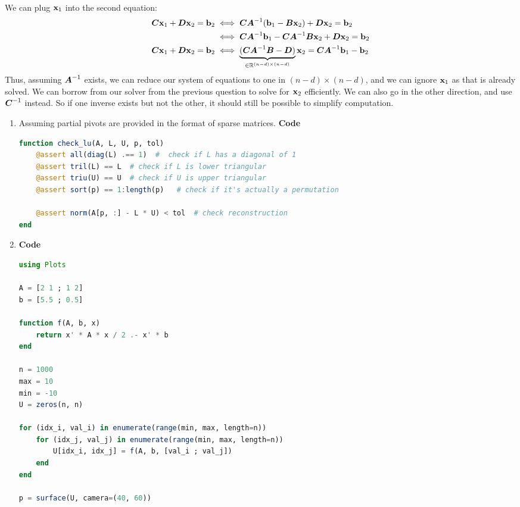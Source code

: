 \documentclass[]{exam}
\begin{document}
\begin{questions}
\begin{enumerate}[label=\arabic*.]
\begin{gather*}
		\end{gather*}
		We can plug $\boldsymbol{\mathrm{x}}_1$ into the second equation:
		\begin{align*}
			\boldsymbol{C} \boldsymbol{\mathrm{x}}_1 + \boldsymbol{D} \boldsymbol{\mathrm{x}}_2 = \boldsymbol{\mathrm{b}}_2 &\iff \boldsymbol{C} \boldsymbol{A}^{-1} (\boldsymbol{\mathrm{b}}_1 - \boldsymbol{B} \boldsymbol{\mathrm{x}}_2) + \boldsymbol{D} \boldsymbol{\mathrm{x}}_2 = \boldsymbol{\mathrm{b}}_2 \\
			&\iff \boldsymbol{C} \boldsymbol{A}^{-1} \boldsymbol{\mathrm{b}}_1 - \boldsymbol{C} \boldsymbol{A}^{-1} \boldsymbol{B} \boldsymbol{\mathrm{x}}_2 + \boldsymbol{D} \boldsymbol{\mathrm{x}}_2 = \boldsymbol{\mathrm{b}}_2 \\
			\boldsymbol{C} \boldsymbol{\mathrm{x}}_1 + \boldsymbol{D} \boldsymbol{\mathrm{x}}_2 = \boldsymbol{\mathrm{b}}_2 &\iff \underbrace{(\boldsymbol{C} \boldsymbol{A}^{-1} \boldsymbol{B} - \boldsymbol{D})}_{\in \mathbb{R}^{(n - d) \times (n - d)}} \boldsymbol{\mathrm{x}}_2 = \boldsymbol{C} \boldsymbol{A}^{-1} \boldsymbol{\mathrm{b}}_1 - \boldsymbol{\mathrm{b}}_2
		\end{align*}
		Thus, assuming $\boldsymbol{A}^{-1}$ exists, we can reduce our system of equations to one in $(n - d) \times (n - d)$, and we can ignore $\boldsymbol{\mathrm{x}}_1$ as that is already solved. We can borrow from our solver from the previous question to solve for $\boldsymbol{\mathrm{x}}_2$ efficiently. We can also go in the other direction, and use $\boldsymbol{C}^{-1}$ instead. So if one inverse exists but not the other, it should still be possible to simplify computation.
\end{enumerate}

\newpage
\question
\hfill

\begin{enumerate}[label=\arabic*.]
	\item Assuming partial pivots are provided in the format of sparse matrices. \textbf{Code}
		\begin{lstlisting}[language=julia]
function check_lu(A, L, U, p, tol)
	@assert all(diag(L) .== 1)  #  check if L has a diagonal of 1
	@assert tril(L) == L  # check if L is lower triangular
	@assert triu(U) == U  # check if U is upper triangular
	@assert sort(p) == 1:length(p)   # check if it's actually a permutation

	@assert norm(A[p, :] - L * U) < tol  # check reconstruction
end
		\end{lstlisting}
	\item \textbf{Code}
		\begin{lstlisting}[language=julia]
using Plots

A = [2 1 ; 1 2]
b = [5.5 ; 0.5]

function f(A, b, x)
	return x' * A * x / 2 .- x' * b
end

n = 1000
max = 10
min = -10
U = zeros(n, n)

for (idx_i, val_i) in enumerate(range(min, max, length=n))
	for (idx_j, val_j) in enumerate(range(min, max, length=n))
		U[idx_i, idx_j] = f(A, b, [val_i ; val_j])
	end
end

p = surface(U, camera=(40, 60))
		\end{lstlisting}

\end{enumerate}
\end{questions}
\end{document}

